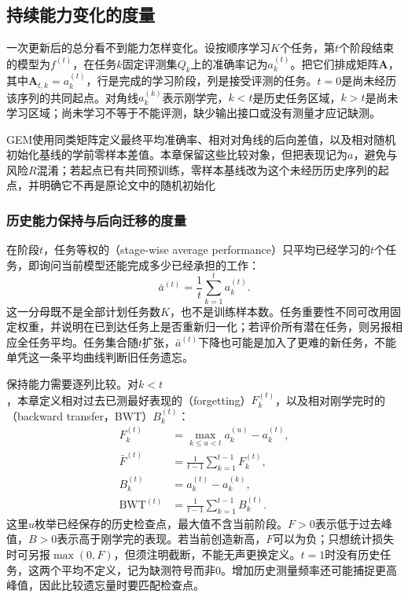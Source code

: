 \subsection{持续能力变化的度量}
\label{sec:ket-evaluation-continuous}

一次更新后的总分看不到能力怎样变化。设按顺序学习$K$个任务，第$t$个阶段结束的模型为$f^{(t)}$，在任务$k$固定评测集$Q_k$上的准确率记为$a_k^{(t)}$。把它们排成矩阵$\bm A$，其中$\bm A_{t,k}=a_k^{(t)}$，行是完成的学习阶段，列是接受评测的任务。$t=0$是尚未经历该序列的共同起点。对角线$a_k^{(k)}$表示刚学完，$k<t$是历史任务区域，$k>t$是尚未学习区域；尚未学习不等于不能评测，缺少输出接口或没有测量才应记缺测。

GEM使用同类矩阵定义最终平均准确率、相对对角线的后向差值，以及相对随机初始化基线的学前零样本差值。本章保留这些比较对象，但把表现记为$a$，避免与风险$R$混淆；若起点已有共同预训练，零样本基线改为这个未经历历史序列的起点，并明确它不再是原论文中的随机初始化

\subsubsection{历史能力保持与后向迁移的度量}
\label{sec:ket-evaluation-backward}

在阶段$t$，任务等权的（stage-wise average performance）只平均已经学习的$t$个任务，即询问当前模型还能完成多少已经承担的工作：
\begin{equation}
  \bar a^{(t)}=\frac1t\sum_{k=1}^{t}a_k^{(t)}.
  \label{eq:ket-evaluation-stage-average}
\end{equation}
这一分母既不是全部计划任务数$K$，也不是训练样本数。任务重要性不同可改用固定权重，并说明在已到达任务上是否重新归一化；若评价所有潜在任务，则另报相应全任务平均。任务集合随$t$扩张，$\bar a^{(t)}$下降也可能是加入了更难的新任务，不能单凭这一条平均曲线判断旧任务遗忘。

保持能力需要逐列比较。对$k<t$，本章定义相对过去已测最好表现的（forgetting）$F_k^{(t)}$，以及相对刚学完时的（backward transfer，BWT）$B_k^{(t)}$：
\begin{equation}
  \begin{aligned}
    F_k^{(t)}&=\max_{k\leq u<t}a_k^{(u)}-a_k^{(t)},\\
    \bar F^{(t)}&=\frac1{t-1}\sum_{k=1}^{t-1}F_k^{(t)},\\
    B_k^{(t)}&=a_k^{(t)}-a_k^{(k)},\\
    \operatorname{BWT}^{(t)}&=\frac1{t-1}\sum_{k=1}^{t-1}B_k^{(t)}.
  \end{aligned}
  \label{eq:ket-evaluation-forgetting-bwt}
\end{equation}
这里$u$枚举已经保存的历史检查点，最大值不含当前阶段。$F>0$表示低于过去峰值，$B>0$表示高于刚学完的表现。若当前创造新高，$F$可以为负；只想统计损失时可另报$\max(0,F)$，但须注明截断，不能无声更换定义。$t=1$时没有历史任务，这两个平均不定义，记为缺测符号而非0。增加历史测量频率还可能捕捉更高峰值，因此比较遗忘量时要匹配检查点。

